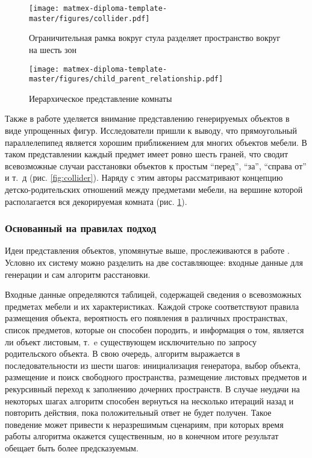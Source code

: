 \begin{figure}
  \centering
  \begin{minipage}{0.45\textwidth}
    \texttt{[image: matmex-diploma-template-master/figures/collider.pdf]}
    \caption{Ограничительная рамка вокруг стула разделяет пространство вокруг на шесть зон}
    \label{fig:collider}
  \end{minipage}
  \hfill
  \begin{minipage}{0.45\textwidth}
    \texttt{[image: matmex-diploma-template-master/figures/child\_parent\_relationship.pdf]}
    \caption{Иерархическое представление комнаты}
    \label{fig:room_relationship}
  \end{minipage}
\end{figure}

Также в работе уделяется внимание представлению генерируемых объектов в виде упрощенных фигур. Исследователи пришли к выводу, что прямоугольный параллелепипед является хорошим приближением для многих объектов мебели. В таком представлении каждый предмет имеет ровно шесть граней, что сводит всевозможные случаи расстановки объектов к простым \enquote{перед}, \enquote{за}, \enquote{справа от} и т.~д (рис. \ref{fig:collider}). Наряду с этим авторы рассматривают концепцию детско-родительских отношений между предметами мебели, на вершине которой располагается вся декорируемая комната (рис. \ref{fig:room_relationship}).

\subsubsection{Основанный на правилах подход}

Идеи представления объектов, упомянутые выше, прослеживаются в работе \cite{lidberg2020hierarchical}. Условно их систему можно разделить на две составляющее: входные данные для генерации и сам алгоритм расстановки.

Входные данные определяются таблицей, содержащей сведения о всевозможных предметах мебели и их характеристиках.
Каждой строке соответствуют правила размещения объекта, вероятность его появления в различных пространствах, список предметов, которые он способен породить, и информация о том, является ли объект листовым, т.~e существующем исключительно по запросу родительского объекта. В свою очередь, алгоритм выражается в последовательности из шести шагов: инициализация генератора, выбор объекта, размещение и поиск свободного пространства, размещение листовых предметов и рекурсивный переход к заполнению дочерних пространств. В случае неудачи на некоторых шагах алгоритм способен вернуться на несколько итераций назад и повторить действия, пока положительный ответ не будет получен. Такое поведение может привести к неразрешимым сценариям, при которых время работы алгоритма окажется существенным, но в конечном итоге результат обещает быть более предсказуемым. 

